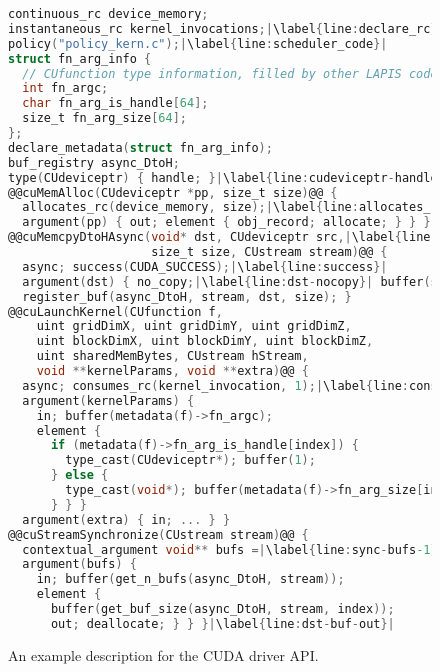 
\begin{figure}
\begin{lstlisting}[language=C,style=nwspecc,columns=flexible,belowskip=-0.5em,aboveskip=-0.5em,mathescape,basicstyle={\scriptsize\ttfamily}]
continuous_rc device_memory;
instantaneous_rc kernel_invocations;|\label{line:declare_rc}|
policy("policy_kern.c");|\label{line:scheduler_code}|
struct fn_arg_info {
  // CUfunction type information, filled by other LAPIS code
  int fn_argc;
  char fn_arg_is_handle[64];
  size_t fn_arg_size[64];
};
declare_metadata(struct fn_arg_info);
buf_registry async_DtoH;
type(CUdeviceptr) { handle; }|\label{line:cudeviceptr-handle}|
@@cuMemAlloc(CUdeviceptr *pp, size_t size)@@ {
  allocates_rc(device_memory, size);|\label{line:allocates_rc}|
  argument(pp) { out; element { obj_record; allocate; } } }
@@cuMemcpyDtoHAsync(void* dst, CUdeviceptr src,|\label{line:cuMemcpyDtoHAsync}|
                    size_t size, CUstream stream)@@ {
  async; success(CUDA_SUCCESS);|\label{line:success}|
  argument(dst) { no_copy;|\label{line:dst-nocopy}| buffer(size); lifetime_manual; }
  register_buf(async_DtoH, stream, dst, size); }
@@cuLaunchKernel(CUfunction f,
    uint gridDimX, uint gridDimY, uint gridDimZ,
    uint blockDimX, uint blockDimY, uint blockDimZ,
    uint sharedMemBytes, CUstream hStream,
    void **kernelParams, void **extra)@@ {
  async; consumes_rc(kernel_invocation, 1);|\label{line:consume_rc}|
  argument(kernelParams) {
    in; buffer(metadata(f)->fn_argc);
    element {
      if (metadata(f)->fn_arg_is_handle[index]) {
        type_cast(CUdeviceptr*); buffer(1);
      } else {
        type_cast(void*); buffer(metadata(f)->fn_arg_size[index]);
      } } }
  argument(extra) { in; ... } }
@@cuStreamSynchronize(CUstream stream)@@ {
  contextual_argument void** bufs =|\label{line:sync-bufs-1}| get_bufs(async_DtoH, stream);|\label{line:sync-bufs-2}|
  argument(bufs) {
    in; buffer(get_n_bufs(async_DtoH, stream));
    element {
      buffer(get_buf_size(async_DtoH, stream, index));
      out; deallocate; } } }|\label{line:dst-buf-out}|
\end{lstlisting}
\caption{
An example \Lapis description for the CUDA driver API.
}
\end{figure}
